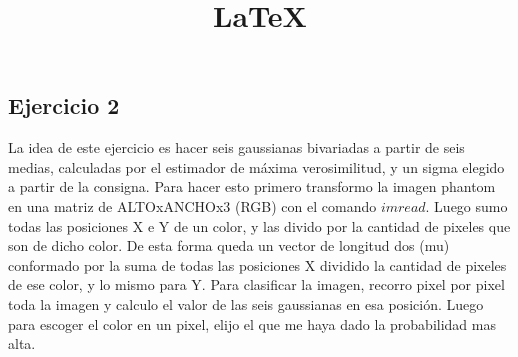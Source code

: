 \documentclass[12pt]{article}
\title{\LaTeX}
\date{}
\begin{document}
\subsection{Ejercicio 2}
La idea de este ejercicio es hacer seis gaussianas bivariadas a partir de seis medias, calculadas por el estimador de máxima verosimilitud, y un sigma elegido a partir de la consigna. \newline
Para hacer esto primero transformo la imagen phantom en una matriz de ALTOxANCHOx3 (RGB) con el comando $imread$. Luego sumo todas las posiciones X e Y de un color, y las divido por la cantidad de pixeles que son de dicho color. De esta forma queda un vector de longitud dos (mu) conformado por la suma de todas las posiciones X dividido la cantidad de pixeles de ese color, y lo mismo para Y.\newline 
Para clasificar la imagen, recorro pixel por pixel toda la imagen y calculo el valor de las seis gaussianas en esa posición. Luego para escoger el color en un pixel, elijo el que me haya dado la probabilidad mas alta. 
\end{document}
